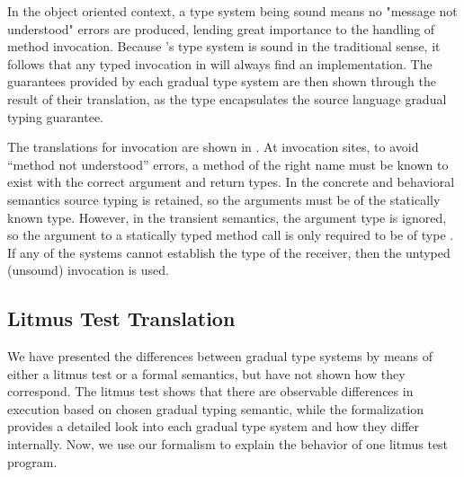 \documentclass[a4paper,USenglish]{tex/lipics-v2016}
\begin{document}
In the object oriented context, a type system being sound means no
"message not understood" errors are produced, lending great importance to the
handling of method invocation. Because \kafka's type system is sound in the
traditional sense, it follows that any typed invocation in \kafka will always
find an implementation. The guarantees provided by each gradual type system are
then shown through the result of their translation, as the \kafka type encapsulates
the source language gradual typing guarantee.


The translations for invocation are shown in . At
invocation sites, to avoid ``method not understood'' errors, a method of the
right name must be known to exist with the correct argument and return types.
In the concrete and behavioral semantics source typing is retained, so the
arguments must be of the statically known type. However, in the transient
semantics, the argument type is ignored, so the argument to a statically typed
method call is only required to be of type \any. If any of the systems cannot
establish the type of the receiver, then the untyped (unsound) invocation is
used.

\subsection{Litmus Test Translation}

We have presented the differences between gradual type systems by means of
either a litmus test or a formal semantics, but have not shown how they
correspond. The litmus test shows that there are observable differences in
execution based on chosen gradual typing semantic, while the formalization
provides a detailed look into each gradual type system and how they differ
internally. Now, we use our formalism to explain the behavior of one litmus
test program.
\end{document}
